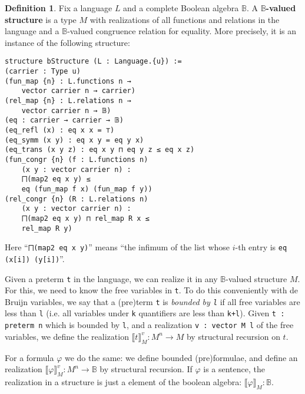 \documentclass[sigplan,10pt,review, anonymous]{acmart}
\newcommand{\B}{\mathbb{B}}
\newcommand{\lil}{\lstinline}
\theoremstyle{definition}
\newtheorem{defn}{Definition}[section]
\begin{document}
\begin{defn}\label{def-boolean-valued-structure}
  Fix a language $L$ and a complete Boolean algebra $\B$. A \textbf{$\B$-valued structure} is a type $M$ with realizations of all functions and relations in the language and a $\B$-valued congruence relation for equality. More precisely, it is an instance of the following structure:
  \begin{lstlisting}
structure bStructure (L : Language.{u}) :=
(carrier : Type u)
(fun_map {n} : L.functions n →
    vector carrier n → carrier)
(rel_map {n} : L.relations n →
    vector carrier n → 𝔹)
(eq : carrier → carrier → 𝔹)
(eq_refl (x) : eq x x = ⊤)
(eq_symm (x y) : eq x y = eq y x)
(eq_trans (x y z) : eq x y ⊓ eq y z ≤ eq x z)
(fun_congr {n} (f : L.functions n)
    (x y : vector carrier n) :
    ⨅(map2 eq x y) ≤
    eq (fun_map f x) (fun_map f y))
(rel_congr {n} (R : L.relations n)
    (x y : vector carrier n) :
    ⨅(map2 eq x y) ⊓ rel_map R x ≤
    rel_map R y)
\end{lstlisting}
Here ``\lstinline{⨅(map2 eq x y)}'' means ``the infimum of the list whose $i$-th entry is \lil{eq (x[i]) (y[i])}''.
\end{defn}

Given a preterm \lil{t} in the language, we can realize it in any $\B$-valued structure $M$.
For this, we need to know the free variables in \lil{t}.
To do this conveniently with de Bruijn variables, we say that a (pre)term \lil{t} is \emph{bounded by \lil{l}} if all free variables are less than \lil{l} (i.e. all variables under \lil{k} quantifiers are less than \lil{k+l}).
Given \lil{t : preterm n} which is bounded by \lil{l}, and a realization \lil{v : vector M l} of the free variables, we define the realization $\llbracket t \rrbracket_M^v : M^n \to M$ by structural recursion on $t$.

For a formula $\varphi$ we do the same: we define bounded (pre)formulae, and define an realization $\llbracket \varphi \rrbracket_M^v : M^n \to \B$ by structural recursion.
If $\varphi$ is a sentence, the realization in a structure is just a element of the boolean algebra: $\llbracket \varphi \rrbracket_M : \B$.
\end{document}
